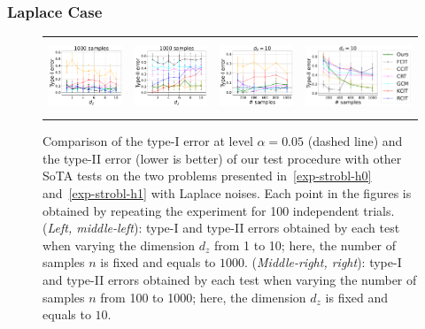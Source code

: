 \newpage


\subsubsection{Laplace Case}
\vspace{-0.4cm}






\begin{figure}[htb]
\begin{tabular}{cccc} 
\includegraphics[height=2.2cm]{sections/appendix/independence_testing_kernel/new_figures_lap/nsamples_fixed_1000_strobl_dim_1_10_typeI.pdf}& \includegraphics[height=2.2cm]{sections/appendix/independence_testing_kernel/new_figures_lap/nsamples_fixed_1000_strobl_dim_1_10_typeII.pdf} & 
\includegraphics[height=2.2cm]{sections/appendix/independence_testing_kernel/new_figures_lap/dim_fixed_10_strobl_typeI.pdf}& \includegraphics[height=2.2cm]{sections/appendix/independence_testing_kernel/new_figures_lap/dim_fixed_10_strobl_typeII.pdf} 
\end{tabular}
\caption{Comparison of the type-I error at level $\alpha=0.05$ (dashed line) and the type-II error (lower is better) of our test procedure with other SoTA tests on the two problems presented in~\eqref{exp-strobl-h0} and~\eqref{exp-strobl-h1} with Laplace noises. Each point in the figures is obtained by repeating the experiment for 100 independent trials. (\emph{Left, middle-left}): type-I and type-II errors obtained by each test when varying the dimension $d_z$ from 1 to 10; here, the number of samples $n$ is fixed and equals to $1000$. (\emph{Middle-right, right}): type-I and type-II errors obtained by each test when varying the number of samples $n$ from 100 to 1000; here, the dimension $d_z$ is fixed and equals to $10$.
\label{fig-exp-strobl-laplace-supp}}
\vspace{-0.5cm}
\end{figure}




